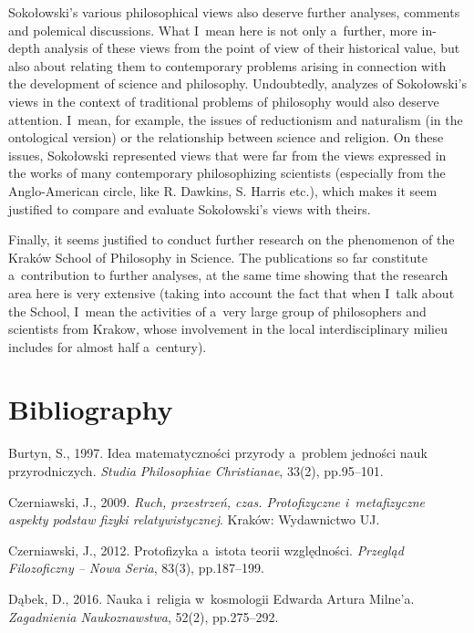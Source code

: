 Sokołowski's various philosophical views also deserve further analyses, comments and polemical discussions. What I~mean here is not only a~further, more in-depth analysis of these views from the point of view of their historical value, but also about relating them to contemporary problems arising in connection with the development of science and philosophy. Undoubtedly, analyzes of Sokołowski's views in the context of traditional problems of philosophy would also deserve attention. I~mean, for example, the issues of reductionism and naturalism (in the ontological version) or the relationship between science and religion. On these issues, Sokołowski represented views that were far from the views expressed in the works of many contemporary philosophizing scientists (especially from the Anglo-American circle, like R. Dawkins, S. Harris etc.), which makes it seem justified to compare and evaluate Sokołowski's views with theirs.



Finally, it seems justified to conduct further research on the phenomenon of the Kraków School of Philosophy in Science. The publications so far constitute a~contribution to further analyses, at the same time showing that the research area here is very extensive (taking into account the fact that when I~talk about the School, I~mean the activities of a~very large group of philosophers and scientists from Krakow, whose involvement in the local interdisciplinary milieu includes for almost half a~century).



\section{Bibliography}

Burtyn, S., 1997. Idea matematyczności przyrody a~problem jedności nauk przyrodniczych. \textit{Studia Philosophiae Christianae}, 33(2), pp.95–101.



Czerniawski, J., 2009. \textit{Ruch, przestrzeń, czas. Protofizyczne i~metafizyczne aspekty podstaw fizyki relatywistycznej}. Kraków: Wydawnictwo UJ.



Czerniawski, J., 2012. Protofizyka a~istota teorii względności. \textit{Przegląd Filozoficzny -- Nowa Seria}, 83(3), pp.187–199.



Dąbek, D., 2016. Nauka i~religia w~kosmologii Edwarda Artura Milne'a. \textit{Zagadnienia Naukoznawstwa}, 52(2), pp.275–292.



